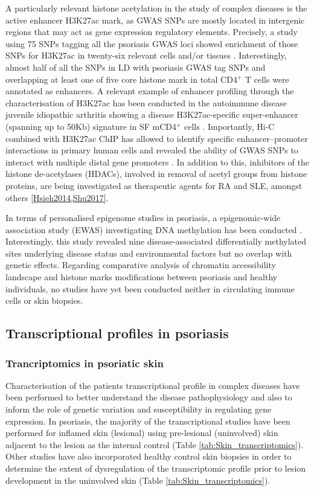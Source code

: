 A particularly relevant histone acetylation in the study of complex diseases is the active enhancer H3K27ac mark, as GWAS SNPs are mostly located in intergenic regions that may act as gene expression regulatory elements. Precisely, a study using 75 SNPs tagging all the psoriasis GWAS loci showed enrichment of those SNPs for H3K27ac in twenty-six relevant cells and/or tissues \parencite{Lin2018}. Interestingly, almost half of all the SNPs in LD with psoriasis GWAS tag SNPs and overlapping at least one of five core histone mark in total CD4$^+$ T cells were annotated as enhancers. A relevant example of enhancer profiling through the characterisation of H3K27ac has been conducted in the autoimmune disease juvenile idiopathic arthritis showing a disease H3K27ac-specific super-enhancer (spanning up to 50Kb) signature in SF mCD4$^+$ cells \parencite{Peeters2015}. Importantly, Hi-C combined with H3K27ac ChIP has allowed to identify specific enhancer–promoter interactions in primary human cells and revealed the ability of GWAS SNPs to interact with multiple distal gene promoters \parencite{Mumbach2017}. In addition to this, inhibitors of the histone de-acetylases (HDACs), involved in removal of acetyl groups from histone proteins, are being investigated as therapeutic agents for RA and SLE, amongst others \ref{Hsieh2014,Shu2017}.

In terms of personalised epigenome studies in psoriasis, a epigenomic-wide association study (EWAS) investigating DNA methylation has been conducted \parencite{Zhou2016}. Interestingly, this study revealed nine disease-associated differentially methylated sites underlying disease status and environmental factors but no overlap with genetic effects. Regarding comparative analysis of chromatin accessibility landscape and histone marks modifications between psoriasis and healthy individuals, no studies have yet been conducted neither in circulating immune cells or skin biopsies.


\subsection{Transcriptional profiles in psoriasis}

\subsubsection{Trancriptomics in psoriatic skin}
Characterisation of the patients transcriptional profile in complex diseases have been performed to better understand the disease pathophysiology and also to inform the role of genetic variation and susceptibility in regulating gene expression. In psoriasis, the majority of the transcriptional studies have been performed for inflamed skin (lesional) using pre-lesional (uninvolved) skin adjacent to the lesion as the internal control (Table \ref{tab:Skin_transcriptomics}). Other studies have also incorporated healthy control skin biopsies in order to determine the extent of dysregulation of the transcriptomic profile prior to lesion development in the uninvolved skin (Table \ref{tab:Skin_transcriptomics}). 


